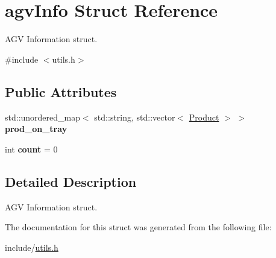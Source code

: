 \hypertarget{structagvInfo}{}\section{agv\+Info Struct Reference}
\label{structagvInfo}


A\+GV Information struct.  




{\ttfamily \#include $<$utils.\+h$>$}

\subsection*{Public Attributes}
\begin{DoxyCompactItemize}
\item 
\mbox{\label{structagvInfo_a54c7918b537ffca61497ffcb0cd93180}} 
std\+::unordered\+\_\+map$<$ std\+::string, std\+::vector$<$ \hyperlink{structProduct}{Product} $>$ $>$ {\bfseries prod\+\_\+on\+\_\+tray}
\item 
\mbox{\label{structagvInfo_a98e263e9827fad038ca72e64fe959c63}} 
int {\bfseries count} = 0
\end{DoxyCompactItemize}


\subsection{Detailed Description}
A\+GV Information struct. 

The documentation for this struct was generated from the following file\+:\begin{DoxyCompactItemize}
\item 
include/\hyperlink{utils_8h}{utils.\+h}\end{DoxyCompactItemize}
